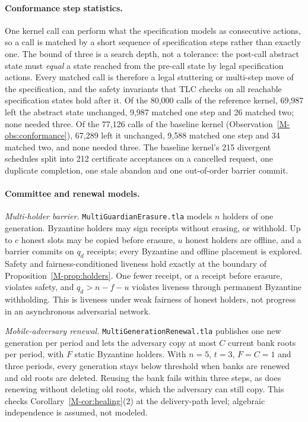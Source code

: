 \documentclass[pdflatex,sn-mathphys-num]{sn-jnl}
\newcommand{\code}[1]{\texttt{#1}}
\theoremstyle{plain}
\begin{document}
\paragraph{Conformance step statistics.}
One kernel call can perform what the specification models as consecutive actions, so a call is matched by a short sequence of specification steps rather than exactly one. The bound of three is a search depth, not a tolerance: the post-call abstract state must \emph{equal} a state reached from the pre-call state by legal specification actions. Every matched call is therefore a legal stuttering or multi-step move of the specification, and the safety invariants that TLC checks on all reachable specification states hold after it. Of the 80,000 calls of the reference kernel, 69,987 left the abstract state unchanged, 9,987 matched one step and 26 matched two; none needed three. Of the 77,126 calls of the baseline kernel (Observation~\ref{M-obs:conformance}), 67,289 left it unchanged, 9,588 matched one step and 34 matched two, and none needed three. The baseline kernel's 215 divergent schedules split into 212 certificate acceptances on a cancelled request, one duplicate completion, one stale abandon and one out-of-order barrier commit.

\paragraph{Committee and renewal models.}
\emph{Multi-holder barrier.} \code{MultiGuardianErasure.tla} models $n$ holders of one generation. Byzantine holders may sign receipts without erasing, or withhold. Up to $c$ honest slots may be copied before erasure, $u$ honest holders are offline, and a barrier commits on $q_d$ receipts; every Byzantine and offline placement is explored. Safety and fairness-conditioned liveness hold exactly at the boundary of Proposition~\ref{M-prop:holders}. One fewer receipt, or a receipt before erasure, violates safety, and $q_d>n-f-u$ violates liveness through permanent Byzantine withholding. This is liveness under weak fairness of honest holders, not progress in an asynchronous adversarial network.

\emph{Mobile-adversary renewal.} \code{MultiGenerationRenewal.tla} publishes one new generation per period and lets the adversary copy at most $C$ current bank roots per period, with $F$ static Byzantine holders. With $n=5$, $t=3$, $F=C=1$ and three periods, every generation stays below threshold when banks are renewed and old roots are deleted. Reusing the bank fails within three steps, as does renewing without deleting old roots, which the adversary can still copy. This checks Corollary~\ref{M-cor:healing}(2) at the delivery-path level; algebraic independence is assumed, not modeled.
\end{document}
